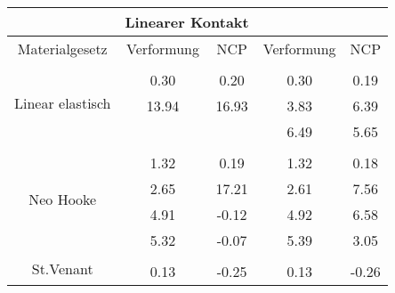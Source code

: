 \begin{table} 
\centering 
\begin{tabular}{c|cc|cc|} 
\cline{2-5} 
 & \multicolumn{2}{|c|}{Linearer Kontakt} &  \\ 
\hline 
\multicolumn{1}{|c|}{Materialgesetz} & \multicolumn{1}{c|}{Verformung} & \multicolumn{1}{c|}{NCP} & \multicolumn{1}{c|}{Verformung} & \multicolumn{1}{c|}{NCP} \\ 
\hline 
\multicolumn{1}{|c|}{\multirow{4}{*}{Linear elastisch}} &\multicolumn{1}{|c|}{} & \multicolumn{1}{|c|}{} & \multicolumn{1}{|c|}{} & \multicolumn{1}{|c|}{} \\ 
\multicolumn{1}{|c|}{} & \multicolumn{1}{|c|}{      0.30} & \multicolumn{1}{|c|}{      0.20} & \multicolumn{1}{|c|}{      0.30} & \multicolumn{1}{|c|}{      0.19} \\ 
\multicolumn{1}{|c|}{} & \multicolumn{1}{|c|}{     13.94} & \multicolumn{1}{|c|}{     16.93} & \multicolumn{1}{|c|}{      3.83} & \multicolumn{1}{|c|}{      6.39} \\ 
\multicolumn{1}{|c|}{} & \multicolumn{1}{|c|}{} & \multicolumn{1}{|c|}{} & \multicolumn{1}{|c|}{      6.49} & \multicolumn{1}{|c|}{      5.65} \\ 
\hline 
\multicolumn{1}{|c|}{\multirow{5}{*}{Neo Hooke}} &\multicolumn{1}{|c|}{} & \multicolumn{1}{|c|}{} & \multicolumn{1}{|c|}{} & \multicolumn{1}{|c|}{} \\ 
\multicolumn{1}{|c|}{} & \multicolumn{1}{|c|}{      1.32} & \multicolumn{1}{|c|}{      0.19} & \multicolumn{1}{|c|}{      1.32} & \multicolumn{1}{|c|}{      0.18} \\ 
\multicolumn{1}{|c|}{} & \multicolumn{1}{|c|}{      2.65} & \multicolumn{1}{|c|}{     17.21} & \multicolumn{1}{|c|}{      2.61} & \multicolumn{1}{|c|}{      7.56} \\ 
\multicolumn{1}{|c|}{} & \multicolumn{1}{|c|}{      4.91} & \multicolumn{1}{|c|}{     -0.12} & \multicolumn{1}{|c|}{      4.92} & \multicolumn{1}{|c|}{      6.58} \\ 
\multicolumn{1}{|c|}{} & \multicolumn{1}{|c|}{      5.32} & \multicolumn{1}{|c|}{     -0.07} & \multicolumn{1}{|c|}{      5.39} & \multicolumn{1}{|c|}{      3.05} \\ 
\hline 
\multicolumn{1}{|c|}{\multirow{7}{*}{St.Venant}} &\multicolumn{1}{|c|}{} & \multicolumn{1}{|c|}{} & \multicolumn{1}{|c|}{} & \multicolumn{1}{|c|}{} \\ 
\multicolumn{1}{|c|}{} & \multicolumn{1}{|c|}{      0.13} & \multicolumn{1}{|c|}{     -0.25} & \multicolumn{1}{|c|}{      0.13} & \multicolumn{1}{|c|}{     -0.26} \\ 

\end{tabular}
\end{table}
